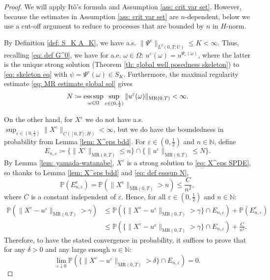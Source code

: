 \documentclass{amsart}
\renewcommand{\MR}{\mathrm{MR}}
\newcommand{\<}{\langle}
\newcommand{\?}{\rangle}
\DeclareMathOperator*{\esssup}{\textup{ess\,sup}}
\theoremstyle{plain}
\theoremstyle{remark}
\theoremstyle{plain}
\numberwithin{equation}{section}
\def\N{{\mathbb N}}
\renewcommand{\P}{\mathbb{P}}
\newcommand{\om}{\omega}
\newcommand{\Om}{\Omega}
\newcommand{\eps}{\varepsilon}
\begin{document}
\begin{proof}
We will apply It\^o's formula and Assumption \ref{ass: crit var set}. However, because the estimates in Assumption \ref{ass: crit var set} are $n$-dependent, below we use a cut-off argument to reduce to processes that are bounded by $n$ in $H$-norm.

By Definition \ref{def: S_K A_K}, we have a.s. $\|\Psi^\eps\|_{L^2(0,T;U)}\leq K<\infty$. Thus, recalling \eqref{eq: def G^0}, we have for  a.e. $\om\in\Om$: $u^\eps(\om)=u^{\Psi_\eps(\om)}$, where the latter is the unique strong solution  (Theorem \ref{th: global well posedness skeleton}) to \eqref{eq: skeleton eq} with $\psi=\Psi^\eps(\om)\in S_K$. Furthermore, the maximal regularity estimate \eqref{eq: MR estimate global sol} gives
\begin{align}\label{eq: def esssup N}
N\coloneqq \esssup_{\om\in\Om}\sup_{\eps\in(0,\frac{1}{2})}\|u^\eps(\om)\|_{\MR(0,T)}<\infty.
\end{align}

On the other hand, for $X^\eps$ we do not have a.s. $\sup_{\eps\in(0,\frac{1}{2})}\|X^\eps\|_{C([0,T];H)}<\infty$, but we do have the boundedness in probability from Lemma \ref{lem: X^eps bdd}.
For $\eps\in(0,\frac{1}{2})$ and $n\in\N$, define
\[
E_{n,\eps}\coloneqq \{\|X^\eps\|_{\MR(0,T)}\leq n\}\cap \{\|u^{\eps}\|_{\MR(0,T)}\leq N\}.
\]
By Lemma \ref{lem: yamada-watanabe}, $X^\eps$ is a strong solution to \eqref{eq: X^eps SPDE},
so thanks to Lemma \ref{lem: X^eps bdd} and \eqref{eq: def esssup N},
\[
\P(E_{n,\eps}^c)= \P(\|X^\eps\|_{\MR(0,T)}>n) \leq\frac{C}{n^2},
\]
where $C$ is a constant independent of $\eps$.
Hence, for all $\eps\in(0,\frac{1}{2})$ and $n\in\N$:
\begin{align*}
\P(\|X^\eps- u^{\eps}\|_{\MR(0,T)}>\gamma)
&\leq \P(\{\|X^\eps- u^{\eps}\|_{\MR(0,T)}>\gamma\}\cap E_{n,\eps})+\P(E_{n,\eps}^c)\\
&\leq \P(\{\|X^\eps- u^{\eps}\|_{\MR(0,T)}>\gamma\}\cap E_{n,\eps})+\frac{C}{n^2}.
\end{align*}
Therefore, to have the stated convergence in probability, it suffices to prove that for any $\delta>0$ and any large enough $n\in\N$:
\begin{equation}\label{eq: X^eps weak conv to show 2}
  \lim_{\eps\downarrow 0}\P(\{\|X^\eps- u^{\eps}\|_{\MR(0,T)}>\delta\}\cap E_{n,\eps})=0.
\end{equation}


\end{proof}
\end{document}
